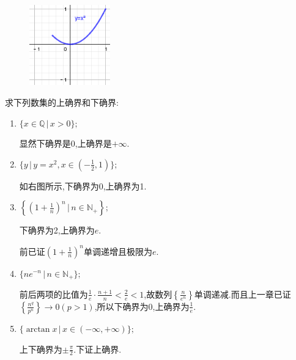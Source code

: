 \documentclass[cn,chinese,fontset]{elegantbook}
\begin{document}
      \begin{figure}
          \includegraphics[width=3.5cm]{第三章 实数系的基本定理/3.1 确界的概念和确界存在定理/图一.png}
          \caption{}
      \end{figure}
      \begin{exercise}
          求下列数集的上确界和下确界:
          \begin{enumerate}
              \item $\{x\in \mathbb{Q}\,\lvert\, x>0\};$
                    \begin{solution}
                        显然下确界是0,上确界是$+\infty$.
                    \end{solution}\item $\{y\,\lvert\, y=x^2,x\in(-\frac{1}{2},1)\};$
                    \begin{solution}
                        如右图所示,下确界为0,上确界为1.
                    \end{solution}\item $\left\{\left(1+\frac{1}{n}\right)^n \,\bigg\lvert\, n\in \mathbb{N}_+\right\};$
                    \begin{solution}
                        下确界为2,上确界为$e$.

                        前已证$\left(1+\frac{1}{n}\right)^n$单调递增且极限为$e$.
                    \end{solution}\item $\{ne^{-n}\,\lvert\, n\in \mathbb{N}_+\};$
                    \begin{solution}
                        前后两项的比值为$\frac{1}{e}\cdot\frac{n+1}{n}<\frac{2}{e}<1$,故数列$\left\{\frac{n}{e^n}\right\}$单调递减.而且上一章已证$\left\{\frac{n^q}{p^n}\right\}\to 0(p>1)$,所以下确界为0,上确界为$\frac{1}{e}$.
                    \end{solution}\item $\{\arctan x \,\lvert\, x\in (-\infty,+\infty)\};$
                    \begin{solution}
                        上下确界为$\pm \frac{\pi}{2}$.下证上确界.


\end{solution}
\end{enumerate}
\end{exercise}
\end{document}
